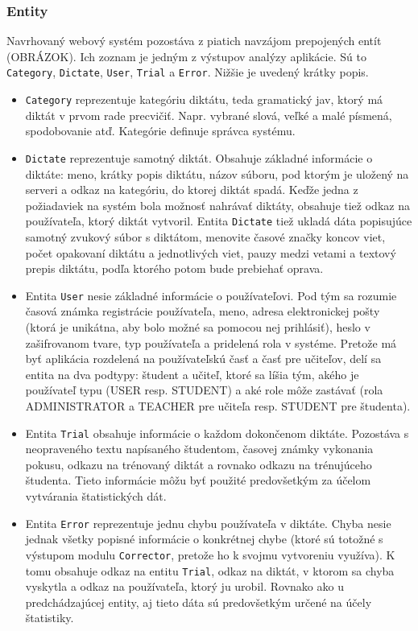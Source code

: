 \documentclass[12pt,oneside]{fithesis2}
\begin{document}
      \subsubsection{Entity}
      \par Navrhovaný webový systém pozostáva z piatich navzájom prepojených entít (OBRÁZOK). Ich zoznam je jedným z výstupov analýzy aplikácie. Sú to \texttt{Category}, \texttt{Dictate}, \texttt{User}, \texttt{Trial} a \texttt{Error}. Nižšie je uvedený krátky popis.
      \begin{itemize}
	\item \texttt{Category} reprezentuje kategóriu diktátu, teda gramatický jav, ktorý má diktát v prvom rade precvičiť. Napr. vybrané slová, veľké a malé písmená, spodobovanie atď. Kategórie definuje správca systému.
	\item \texttt{Dictate} reprezentuje samotný diktát. Obsahuje základné informácie o diktáte: meno, krátky popis diktátu, názov súboru, pod ktorým je uložený na serveri a odkaz na kategóriu, do ktorej diktát spadá. Keďže jedna z požiadaviek na systém bola možnosť nahrávať diktáty, obsahuje tiež odkaz na používateľa, ktorý diktát vytvoril. Entita \texttt{Dictate} tiež ukladá dáta popisujúce samotný zvukový súbor s diktátom, menovite časové značky koncov viet, počet opakovaní diktátu a jednotlivých viet, pauzy medzi vetami a textový prepis diktátu, podľa ktorého potom bude prebiehať oprava.
	\item Entita \texttt{User} nesie základné informácie o používateľovi. Pod tým sa rozumie časová známka registrácie používateľa, meno, adresa elektronickej pošty (ktorá je unikátna, aby bolo možné sa pomocou nej prihlásiť), heslo v zašifrovanom tvare, typ používateľa a pridelená rola v systéme. Pretože má byť aplikácia rozdelená na používateľskú časť a časť pre učiteľov, delí sa entita na dva podtypy: študent a učiteľ, ktoré sa líšia tým, akého je používateľ typu (USER resp. STUDENT) a aké role môže zastávať (rola ADMINISTRATOR a TEACHER pre učiteľa resp. STUDENT pre študenta). 
	\item Entita \texttt{Trial} obsahuje informácie o každom dokončenom diktáte. Pozostáva s neopraveného textu napísaného študentom, časovej známky vykonania pokusu, odkazu na trénovaný diktát a rovnako odkazu na trénujúceho študenta. Tieto informácie môžu byť použité predovšetkým za účelom vytvárania štatistických dát.
	\item Entita \texttt{Error} reprezentuje jednu chybu používateľa v diktáte. Chyba nesie jednak všetky popisné informácie o konkrétnej chybe (ktoré sú totožné s výstupom modulu \texttt{Corrector}, pretože ho k svojmu vytvoreniu využíva). K tomu obsahuje odkaz na entitu \texttt{Trial}, odkaz na diktát, v ktorom sa chyba vyskytla a odkaz na používateľa, ktorý ju urobil. Rovnako ako u predchádzajúcej entity, aj tieto dáta sú predovšetkým určené na účely štatistiky. 
		\end{itemize}
      \par 
\end{document}
